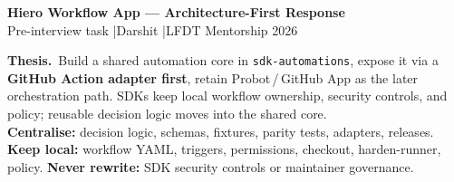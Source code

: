 \documentclass[9pt, a4paper]{article}
\begin{document}
\thispagestyle{fancy}

\begin{center}
  {\normalsize\bfseries\color{hieroBlue}Hiero Workflow App — Architecture-First Response}\\[1pt]
  {\fontsize{7.5}{9}\selectfont\color{hieroGray}%
    Pre-interview task \quad|\quad Darshit \quad|\quad LFDT Mentorship 2026}
\end{center}

\vspace{1pt}{\color{hieroRule}\hrule}\vspace{2pt}

\begin{thesisbox}
\fontsize{8}{9.5}\selectfont
\textbf{Thesis.}\ Build a shared automation core in \texttt{sdk-automations}, expose it via a
\textbf{GitHub Action adapter first}, retain Probot\,/\,GitHub App as the later orchestration
path. SDKs keep local workflow ownership, security controls, and policy; reusable decision
logic moves into the shared core.\\[1pt]
\textbf{Centralise:} decision logic, schemas, fixtures, parity tests, adapters, releases.\quad
\textbf{Keep local:} workflow YAML, triggers, permissions, checkout, harden-runner, policy.\quad
\textbf{Never rewrite:} SDK security controls or maintainer governance.
\end{thesisbox}

\vspace{1pt}{\color{hieroRule}\hrule}\vspace{2pt}
\end{document}
